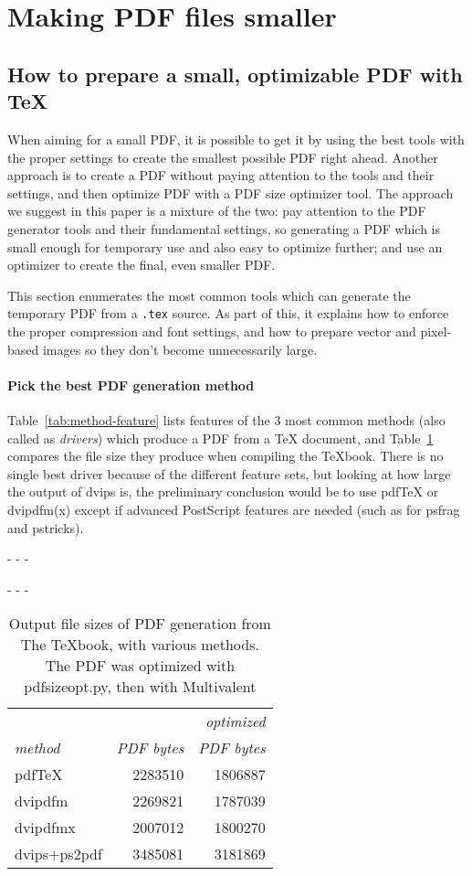 \documentclass{ltugproc}
\def\cmd{\textsf}
\def\pkg{\textsf}
\def\captiontop#1{%
  \advance\abovecaptionskip-\belowcaptionskip
  \advance\belowcaptionskip\abovecaptionskip
  \advance\abovecaptionskip-\belowcaptionskip
  \abovecaptionskip-\abovecaptionskip
  \caption{#1}%
  \advance\abovecaptionskip-\belowcaptionskip
  \advance\belowcaptionskip\abovecaptionskip
  \advance\abovecaptionskip-\belowcaptionskip
  \abovecaptionskip-\abovecaptionskip
}
\begin{document}
\section{Making PDF files smaller}

\subsection{How to prepare a small, optimizable PDF with \TeX{}}\label{tex-to-pdf}

When aiming for a small PDF, it is possible to get it by using the best
tools with the proper settings to create the smallest possible PDF right
ahead. Another approach is to create a PDF without paying attention to
the tools and their settings, and then optimize PDF with a PDF size
optimizer tool. The approach we suggest in this paper is a mixture of the two:
pay attention to the PDF generator tools and their fundamental settings, so
generating a PDF which is small enough for temporary use and also
easy to optimize further; and use an optimizer to create the final,
even smaller PDF.

This section enumerates the most common tools which can generate the
temporary PDF from a \texttt{.tex} source. As part of this, it explains how
to enforce the proper compression and font settings, and how to
prepare vector and pixel-based images so they don't become unnecessarily
large.

\paragraph{Pick the best PDF generation method}
Table~\ref{tab:method-feature} lists features of the 3 most common methods
(also called as \emph{drivers}) which produce a PDF from a \TeX{} document,
and Table~\ref{tab:texbook-to-pdf} compares the file size they produce when
compiling the \TeX{}book. There is no single best driver because of the
different feature sets, but looking at how large the output of \cmd{dvips}
is, the preliminary conclusion would be to use pdf\TeX{}
or \cmd{dvipdfm(x)} except if advanced PostScript features are needed (such
as for \pkg{psfrag} and \pkg{pstricks}).

\begin{table}
\captiontop{Output file sizes of PDF generation from The \TeX{}book, with
various methods. The PDF was optimized with \cmd{pdfsizeopt.py}, then with
Multivalent}\label{tab:texbook-to-pdf}
\par\small\noindent\hfil
\begin{tabular}{@{}lrr@{}}
\toprule
                  &&\emph{optimized}\\
\emph{method}     &\emph{PDF bytes}&\emph{PDF bytes}\\\midrule
pdf\TeX           &2283510 &1806887\\
\cmd{dvipdfm}     &2269821 &1787039\\
\cmd{dvipdfmx}    &2007012 &1800270\\
\cmd{dvips}$+$\cmd{ps2pdf}      &3485081 &3181869\\
\bottomrule
\end{tabular}
\end{table}
\end{document}

